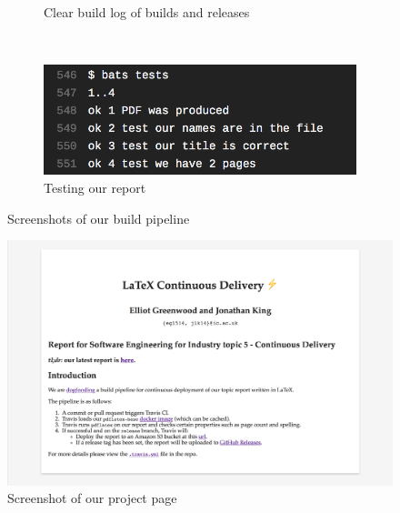 \begin{figure}[ht]
\begin{subfigure}[h]{0.4\linewidth}
    \caption{Clear build log of builds and releases}
    \label{fig:ci-4}
  \end{subfigure}
  \\
  \begin{subfigure}[h]{0.4\linewidth}
    \centering
    \includegraphics[width=\linewidth]{ci-5.png}
    \caption{Testing our report}
    \label{fig:ci-5}
  \end{subfigure}
  \caption{Screenshots of our build pipeline}
  \label{fig:}
\end{figure}

\begin{figure}[ht]
  \centering
  \includegraphics[width=0.7\linewidth]{ci-6.png}
  \caption{Screenshot of our project page}
  \label{fig:}
\end{figure}